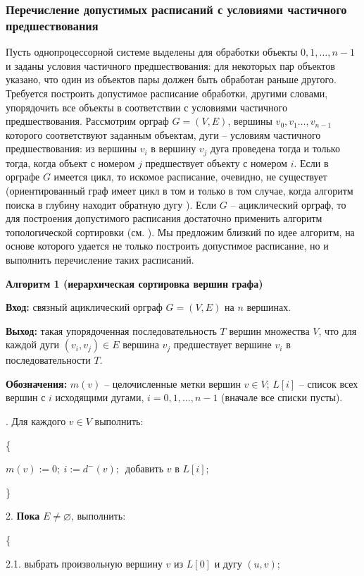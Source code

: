 \subsubsection{Перечисление допустимых расписаний с условиями частичного предшествования}
\label{subsec12}
Пусть однопроцессорной системе выделены для обработки объекты $0,1,\dots,n-1$ и заданы условия частичного предшествования: для некоторых пар объектов указано, что один из объектов пары должен быть обработан раньше другого. Требуется построить допустимое расписание обработки, другими словами, упорядочить все объекты в соответствии с условиями частичного предшествования.
Рассмотрим орграф $G=(V,E)$, вершины $v_0,v_1\dots,v_{n-1}$ которого соответствуют заданным объектам, дуги -- условиям частичного предшествования: из вершины $v_i$ в вершину $v_j$ дуга проведена тогда и только тогда, когда объект с номером $j$ предшествует объекту с номером $i$. Если в орграфе $G$ имеется цикл, то искомое расписание, очевидно, не существует (ориентированный граф имеет цикл в том и только в том случае, когда алгоритм поиска в глубину находит обратную дугу \cite{akm-13Tucker}). Если $G$ – ациклический орграф, то для построения допустимого расписания достаточно применить алгоритм топологической сортировки (см. \cite[с.\,96]{akm-1}). Мы предложим близкий по идее алгоритм, на основе которого удается не только построить допустимое расписание, но и выполнить перечисление таких расписаний.
\par\medskip
\textbf{ Алгоритм 1 (иерархическая сортировка вершин графа)}
\par\smallskip
\textbf{ Вход: } связный ациклический орграф  $G=(V,E)$ на $n$ вершинах.

\textbf{ Выход: } такая упорядоченная последовательность $T$ вершин множества $V$, что для каждой дуги ${(v_i, v_j)\in E}$ вершина $v_j$ предшествует вершине $v_i$ в последовательности $T$.

 \textbf{ Обозначения: } $m(v)$ -- целочисленные метки вершин ${v\in V}$; $L[i]$ -- список всех вершин с $i$ исходящими дугами, $i=0, 1, \dots, n-1$ (вначале все списки пусты).
\par{}. Для каждого $v\in V$ выполнить:

\{

$m(v):=0;\ i:= d^-(v);$\ добавить $v$ в $L[i]$;

\}

2. \textbf{ Пока} $E\neq \varnothing$, выполнить:

	\{
	
		2.1. выбрать произвольную вершину $v$ из $L[0]$ и дугу $(u,v)$;
		

